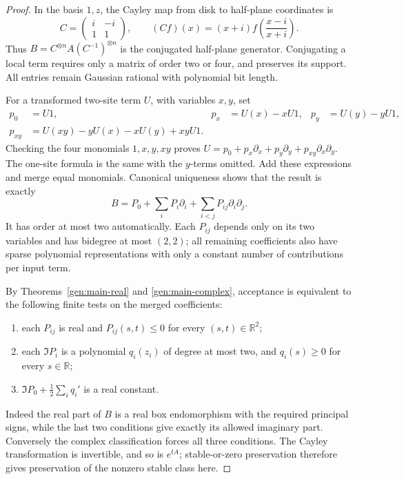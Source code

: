 \documentclass[reqno]{amsart}
\theoremstyle{definition}
\theoremstyle{remark}
\newcommand{\R}{\mathbb R}
\begin{document}
\begin{proof}
In the basis \(1,z\), the Cayley map from disk to half-plane coordinates is
\[
 C=\begin{pmatrix}i&-i\\1&1\end{pmatrix},\qquad
 (Cf)(x)=(x+i)f\left(\frac{x-i}{x+i}\right).
\]
Thus \(B=C^{\otimes n}A(C^{-1})^{\otimes n}\) is the conjugated
half-plane generator. Conjugating a local term requires only a matrix
of order two or four, and preserves its support. All entries remain
Gaussian rational with polynomial bit length.

For a transformed two-site term \(U\), with variables \(x,y\), set
\[
 \begin{aligned}
 p_0&=U1,&p_x&=U(x)-xU1,&p_y&=U(y)-yU1,\\
 p_{xy}&=U(xy)-yU(x)-xU(y)+xyU1.
 \end{aligned}
\]
Checking the four monomials \(1,x,y,xy\) proves
\(U=p_0+p_x\partial_x+p_y\partial_y+p_{xy}\partial_x\partial_y\).
The one-site formula is the same with the \(y\)-terms omitted.
Add these expressions and merge equal monomials. Canonical uniqueness
shows that the result is exactly
\[
 B=P_0+\sum_i P_i\partial_i+\sum_{i<j}P_{ij}\partial_i\partial_j.
\]
It has order at most two automatically. Each \(P_{ij}\) depends only
on its two variables and has bidegree at most \((2,2)\); all remaining
coefficients also have sparse polynomial representations with only a
constant number of contributions per input term.

By Theorems~\ref{gen:main-real} and \ref{gen:main-complex}, acceptance
is equivalent to the following finite tests on the merged coefficients:
\begin{enumerate}
\item each \(P_{ij}\) is real and \(P_{ij}(s,t)\le0\) for every
\((s,t)\in\R^2\);
\item each \(\Im P_i\) is a polynomial \(q_i(z_i)\) of degree at most
two, and \(q_i(s)\ge0\) for every \(s\in\R\);
\item \(\Im P_0+\tfrac12\sum_iq_i'\) is a real constant.
\end{enumerate}
Indeed the real part of \(B\) is a real box endomorphism with the
required principal signs, while the last two conditions give exactly
its allowed imaginary part. Conversely the complex classification
forces all three conditions. The Cayley transformation is invertible,
and so is \(e^{tA}\); stable-or-zero preservation therefore gives
preservation of the nonzero stable class here.


\end{proof}
\end{document}
